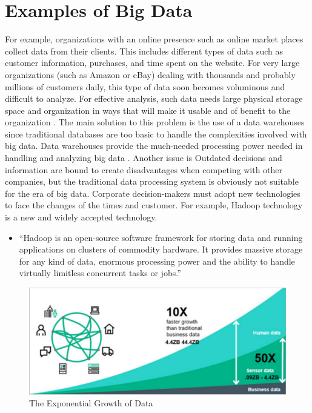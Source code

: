 \documentclass[sigconf]{acmart}
\begin{document}
\section{Examples of Big Data}
For example, organizations with an online presence such as online market places collect data from their clients. This includes different types of data such as customer information, purchases, and time spent on the website. For very large organizations (such as Amazon or eBay) dealing with thousands and probably millions of customers daily, this type of data soon becomes voluminous and difficult to analyze. For effective analysis, such data needs large physical storage space and organization in ways that will make it usable and of benefit to the organization \cite{Arora2016}. The main solution to this problem is the use of a data warehouses since traditional databases are too basic to handle the complexities involved with big data. Data warehouses provide the much-needed processing power needed in handling and analyzing big data \cite{Arora2016}.
Another issue is Outdated decisions and information are bound to create disadvantages when competing with other companies, but the traditional data processing system is obviously not suitable for the era of big data. Corporate decision-makers must adopt new technologies to face the changes of the times and customer. For example, Hadoop technology is a new and widely accepted technology.
\begin{itemize}

  \item ``Hadoop is an open-source software framework for storing data and running applications on clusters of commodity hardware. It provides massive storage for any kind of data, enormous processing power and the ability to handle virtually limitless concurrent tasks or jobs\cite{sas1}.''
\end{itemize}  
\begin{figure}[!ht]
  \centering\includegraphics[width=\columnwidth]{images/data-growth-rate.png}
  \caption{The Exponential Growth of Data \cite{part-reg}}
  \label{Figure 1}
\end{figure}
\end{document}

